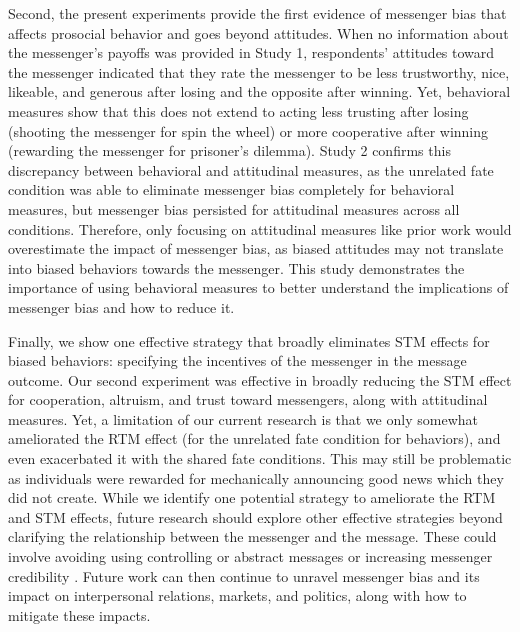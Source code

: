 Second, the present experiments provide the first evidence of
messenger bias that affects prosocial behavior and goes beyond
attitudes. When no information about the messenger's payoffs was
provided in Study 1, respondents' attitudes toward the messenger
indicated that they rate the messenger to be less trustworthy, nice,
likeable, and generous after losing and the opposite after winning. Yet,
behavioral measures show that this does not extend to acting less
trusting after losing (shooting the messenger for spin the wheel) or
more cooperative after winning (rewarding the messenger for prisoner's
dilemma). Study 2 confirms this discrepancy between behavioral and
attitudinal measures, as the unrelated fate condition was able to
eliminate messenger bias completely for behavioral measures, but
messenger bias persisted for attitudinal measures across all conditions.
Therefore, only focusing on attitudinal measures like prior work would
overestimate the impact of messenger bias, as biased attitudes may
not translate into biased behaviors towards the messenger. This study
demonstrates the importance of using behavioral measures to better
understand the implications of messenger bias and how to reduce it.

Finally, we show one effective strategy that broadly eliminates STM
effects for biased behaviors: specifying the incentives of the messenger
in the message outcome. Our second experiment was effective in broadly
reducing the STM effect for cooperation, altruism, and trust toward
messengers, along with attitudinal measures. Yet, a limitation of our
current research is that we only somewhat ameliorated the RTM effect (for the unrelated fate condition for behaviors), and even
exacerbated it with the shared fate conditions. This may still be
problematic as individuals were rewarded for mechanically announcing
good news which they did not create. While we identify one potential
strategy to ameliorate the RTM and STM effects, future research should
explore other effective strategies beyond clarifying the relationship
between the messenger and the message. These could involve avoiding using
controlling or abstract messages \citep[see, e.g.,][]{sparks2008style,miller2007psychological} or increasing messenger credibility \citep[see, e.g.,][]{hunt1984role,kamins1987twosided}. 
Future work can then
continue to unravel messenger bias and its impact on interpersonal
relations, markets, and politics, along with how to mitigate these
impacts.
